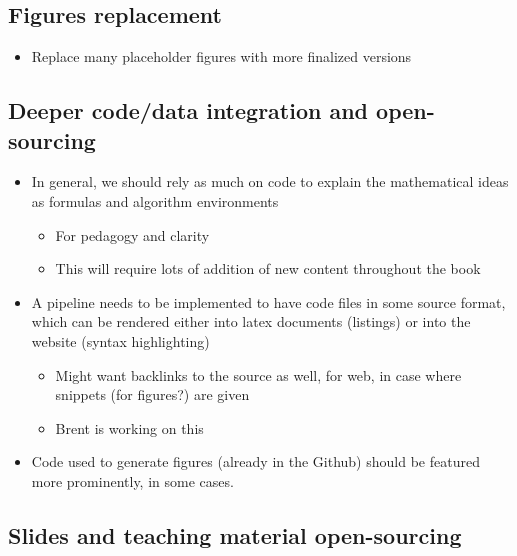 \documentclass{article}
\begin{document}
\subsection{Figures replacement}

\begin{itemize}
    \item Replace many placeholder figures with more finalized versions
\end{itemize}

\subsection{Deeper code/data integration and open-sourcing}

\begin{itemize}
    \item In general, we should rely as much on code to explain the mathematical ideas as formulas and algorithm environments
    \begin{itemize}
        \item For pedagogy and clarity
        \item This will require lots of addition of new content throughout the book
    \end{itemize}
    \item A pipeline needs to be implemented to have code files in some source format, which can be rendered either into latex documents (listings) or into the website (syntax highlighting)
    \begin{itemize}
        \item Might want backlinks to the source as well, for web, in case where snippets (for figures?) are given
        \item Brent is working on this
    \end{itemize}
    \item Code used to generate figures (already in the Github) should be featured more prominently, in some cases.
\end{itemize}

\subsection{Slides and teaching material open-sourcing}
\end{document}
